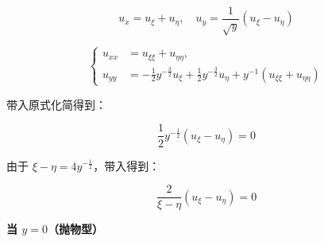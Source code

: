 \[
u_x = u_{\xi} + u_{\eta}, \quad u_y = \frac{1}{\sqrt{y}} ( u_{\xi} - u_{\eta} )
\]

\[
\left\{
\begin{aligned}
u_{xx} &= u_{\xi \xi} + u_{\eta \eta}, \\
u_{yy} &= -\frac{1}{2} y^{- \frac{3}{2}} u_{\xi} + \frac{1}{2} y^{-\frac{3}{2}} u_{\eta} + y^{-1} (u_{\xi \xi} + u_{\eta \eta})
\end{aligned}
\right.
\]

带入原式化简得到：

\[
\frac{1}{2} y^{-\frac{1}{2}} (u_{\xi} - u_{\eta}) = 0
\]

由于 $\xi - \eta = 4y^{-\frac{1}{2}}$，带入得到：

\[
\frac{2}{\xi - \eta} (u_{\xi} - u_{\eta}) = 0
\]

\textbf{当 $y = 0$（抛物型）}
